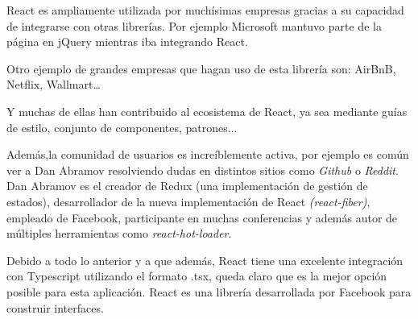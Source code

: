 \bigskip
React es ampliamente utilizada por muchísimas empresas gracias a su capacidad de integrarse con otras librerías. 
Por ejemplo Microsoft mantuvo parte de la página en jQuery mientras iba integrando React.

\bigskip
Otro ejemplo de grandes empresas que hagan uso de esta librería son: AirBnB, Netflix, Wallmart…  \cite{ReactUsers}

\bigskip
Y muchas de ellas han contribuido al ecosistema de React, ya sea mediante guías de estilo, conjunto de componentes, patrones... \cite{ReactStyleGuide}

\bigskip
Además,la comunidad de usuarios es increíblemente activa, por ejemplo es común ver a Dan Abramov resolviendo dudas
en distintos sitios como \textit{Github} o \textit{Reddit}. Dan Abramov es el creador de Redux (una implementación de gestión de estados), desarrollador de la nueva implementación de 
React \textit{(react-fiber)}, empleado de Facebook, participante en muchas conferencias y además autor de 
múltiples herramientas como \textit{react-hot-loader}. 

\bigskip
Debido a todo lo anterior y a que además, React tiene una excelente integración con Typescript utilizando 
el formato .tsx, queda claro que es la mejor opción posible para esta aplicación. React es una librería 
desarrollada por Facebook para construir interfaces.
